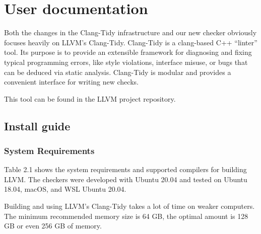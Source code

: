 \chapter{User documentation}
\label{ch:user}

Both the changes in the Clang-Tidy infrastructure and our new checker obviously focuses heavily on LLVM's Clang-Tidy.
Clang-Tidy is a clang-based C++ “linter” tool. Its purpose is to provide an extensible framework for diagnosing and fixing
typical programming errors, like style violations, interface misuse, or bugs that can be deduced via static analysis.
Clang-Tidy is modular and provides a convenient interface for writing new checks. %
\par This tool can be found in the LLVM project repository. %

\section{Install guide}

\subsection{System Requirements}

Table 2.1 shows the system requirements and supported compilers for building
LLVM. The checkers were developed with Ubuntu 20.04 and tested on Ubuntu 18.04,
macOS, and WSL Ubuntu 20.04.
\par Building and using LLVM's Clang-Tidy takes a lot of time on weaker computers. The minimum recommended memory size
is 64 GB, the optimal amount is 128 GB or even 256 GB of memory. %

